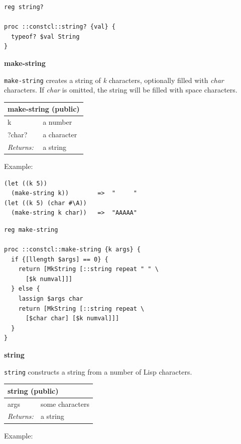\documentclass[twoside,9pt]{report}
\begin{document}
\noindent\makebox[\linewidth]{\rule{\linewidth}{0.4pt}}
\begin{lstlisting}
reg string?
 
proc ::constcl::string? {val} {
  typeof? $val String
}
\end{lstlisting}
\noindent\makebox[\linewidth]{\rule{\linewidth}{0.4pt}}

\textbf{make-string}


\texttt{make-string} creates a string of \emph{k} characters, optionally filled with \emph{char} characters. If \emph{char} is omitted, the string will be filled with space characters.

\begin{tabular}{ |l l| }
\hline
\multicolumn{2}{|l|}{make-string (public)} \\
\hline
k & a number \\
?char? & a character \\
\textit{Returns:} & a string \\
\hline
\end{tabular}


Example:

\noindent\makebox[\linewidth]{\rule{\linewidth}{0.4pt}}
\begin{lstlisting}
(let ((k 5))
  (make-string k))        =>  "     "
(let ((k 5) (char #\A))
  (make-string k char))   =>  "AAAAA"
\end{lstlisting}
\noindent\makebox[\linewidth]{\rule{\linewidth}{0.4pt}}
\noindent\makebox[\linewidth]{\rule{\linewidth}{0.4pt}}
\begin{lstlisting}
reg make-string
 
proc ::constcl::make-string {k args} {
  if {[llength $args] == 0} {
    return [MkString [::string repeat " " \
      [$k numval]]]
  } else {
    lassign $args char
    return [MkString [::string repeat \
      [$char char] [$k numval]]]
  }
}
\end{lstlisting}
\noindent\makebox[\linewidth]{\rule{\linewidth}{0.4pt}}

\textbf{string}


\texttt{string} constructs a string from a number of Lisp characters.

\begin{tabular}{ |l l| }
\hline
\multicolumn{2}{|l|}{string (public)} \\
\hline
args & some characters \\
\textit{Returns:} & a string \\
\hline
\end{tabular}


Example:
\end{document}
